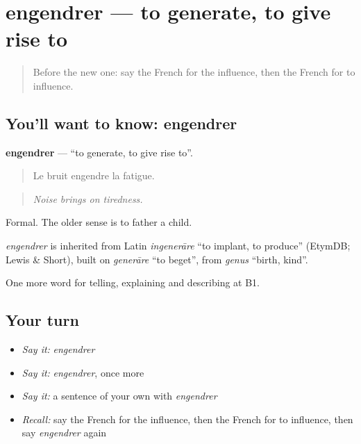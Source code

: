 \section[engendrer]{engendrer — to generate, to give rise to}

\label{lesson:FR-C349-engendrer}



\begin{quote}
Before the new one: say the French for the influence, then the French for to influence.
\end{quote}

\subsection*{You'll want to know: engendrer}
\textbf{engendrer} — \textquotedblleft{}to generate, to give rise to\textquotedblright{}.

\begin{quote}
Le bruit engendre la fatigue.
\end{quote}

\begin{quote}
\emph{Noise brings on tiredness.}
\end{quote}

Formal. The older sense is to father a child.

\begin{cousinweb}
\emph{engendrer} is inherited from Latin \emph{ingenerāre} \textquotedblleft{}to implant, to produce\textquotedblright{} (EtymDB; Lewis \& Short), built on \emph{generāre} \textquotedblleft{}to beget\textquotedblright{}, from \emph{genus} \textquotedblleft{}birth, kind\textquotedblright{}.
\end{cousinweb}

\begin{grammarlens}[title={What you've built}]
One more word for telling, explaining and describing at B1.
\end{grammarlens}

\subsection*{Your turn}
\begin{itemize}
\raggedright
  \item \emph{Say it:} \emph{engendrer}
  \item \emph{Say it:} \emph{engendrer}, once more
  \item \emph{Say it:} a sentence of your own with \emph{engendrer}
  \item \emph{Recall:} say the French for the influence, then the French for to influence, then say \emph{engendrer} again
\end{itemize}

